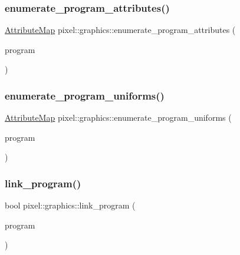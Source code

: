 \mbox{\label{namespacepixel_1_1graphics_a44295d52f1dbfcf05d96984a03dc7dfc}} 
\subsubsection{\texorpdfstring{enumerate\+\_\+program\+\_\+attributes()}{enumerate\_program\_attributes()}}
{\footnotesize\ttfamily \hyperlink{namespacepixel_1_1graphics_ab235534714f227408c552e912c5985de}{Attribute\+Map} pixel\+::graphics\+::enumerate\+\_\+program\+\_\+attributes (\begin{DoxyParamCaption}\item[{G\+Luint}]{program }\end{DoxyParamCaption})}

\mbox{\label{namespacepixel_1_1graphics_ac505118e74ccefdc82a0aa08169cf061}} 
\subsubsection{\texorpdfstring{enumerate\+\_\+program\+\_\+uniforms()}{enumerate\_program\_uniforms()}}
{\footnotesize\ttfamily \hyperlink{namespacepixel_1_1graphics_ab235534714f227408c552e912c5985de}{Attribute\+Map} pixel\+::graphics\+::enumerate\+\_\+program\+\_\+uniforms (\begin{DoxyParamCaption}\item[{G\+Luint}]{program }\end{DoxyParamCaption})}

\mbox{\label{namespacepixel_1_1graphics_abc8f110adf4be5b76408feb64a945f48}} 
\subsubsection{\texorpdfstring{link\+\_\+program()}{link\_program()}}
{\footnotesize\ttfamily bool pixel\+::graphics\+::link\+\_\+program (\begin{DoxyParamCaption}\item[{G\+Luint}]{program }\end{DoxyParamCaption})}

